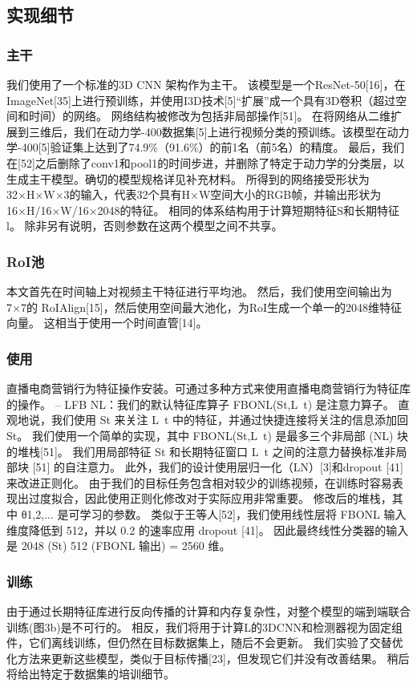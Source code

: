 \subsection{实现细节}

\subsubsection{主干}
我们使用了一个标准的3D CNN 架构作为主干。
该模型是一个ResNet-50[16]，在ImageNet[35]上进行预训练，并使用I3D技术[5]“扩展”成一个具有3D卷积（超过空间和时间）的网络。
网络结构被修改为包括非局部操作[51]。
在将网络从二维扩展到三维后，我们在动力学-400数据集[5]上进行视频分类的预训练。该模型在动力学-400[5]验证集上达到了74.9\%（91.6\%）的前1名（前5名）的精度。
最后，我们在[52]之后删除了conv1和pool1的时间步进，并删除了特定于动力学的分类层，以生成主干模型。确切的模型规格详见补充材料。
所得到的网络接受形状为32×H×W×3的输入，代表32个具有H×W空间大小的RGB帧，并输出形状为16×H/16×W/16×2048的特征。
相同的体系结构用于计算短期特征S和长期特征l。
除非另有说明，否则参数在这两个模型之间不共享。

\subsubsection{RoI池}
本文首先在时间轴上对视频主干特征进行平均池。
然后，我们使用空间输出为7×7的 RoIAlign[15]，然后使用空间最大池化，为RoI生成一个单一的2048维特征向量。
这相当于使用一个时间直管[14]。

\subsubsection{使用}
直播电商营销行为特征操作安装。可通过多种方式来使用直播电商营销行为特征库的操作。
– LFB NL：我们的默认特征库算子 FBONL(St,L~t) 是注意力算子。
直观地说，我们使用 St 来关注 L~t 中的特征，并通过快捷连接将关注的信息添加回 St。
我们使用一个简单的实现，其中 FBONL(St,L~t) 是最多三个非局部 (NL) 块的堆栈[51]。
我们用局部特征 St 和长期特征窗口 L~t 之间的注意力替换标准非局部块 [51] 的自注意力。
此外，我们的设计使用层归一化（LN）[3]和dropout [41]来改进正则化。
由于我们的目标任务包含相对较少的训练视频，在训练时容易表现出过度拟合，因此使用正则化修改对于实际应用非常重要。
修改后的堆栈，其中 θ{1,2,... } 是可学习的参数。 
类似于王等人[52]，我们使用线性层将 FBONL 输入维度降低到 512，并以 0.2 的速率应用 dropout [41]。
因此最终线性分类器的输入是 2048 (St) 512 (FBONL 输出) = 2560 维。

\subsubsection{训练}
由于通过长期特征库进行反向传播的计算和内存复杂性，对整个模型的端到端联合训练(图3b)是不可行的。
相反，我们将用于计算L的3DCNN和检测器视为固定组件，它们离线训练，但仍然在目标数据集上，随后不会更新。
我们实验了交替优化方法来更新这些模型，类似于目标传播[23]，但发现它们并没有改善结果。
稍后将给出特定于数据集的培训细节。


